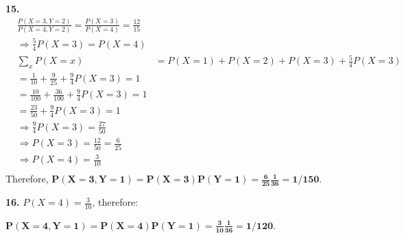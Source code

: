 \documentclass{homework}
\begin{document}
\textbf{\large 15.}
\begin{align*}
    & \frac{P(X=3, Y=2)}{P(X=4, Y=2)} = \frac{P(X=3)}{P(X=4)} = \frac{12}{15}\\
    & \Longrightarrow \frac{5}{4} P(X=3) = P(X=4)\\
    & \sum\limits_{x}{P(X=x)} &= P(X=1) + P(X=2) + P(X=3) + \frac{5}{4} P(X=3) \\
    & = \frac{1}{10} + \frac{9}{25} + \frac{9}{4} P(X=3) = 1\\
    & = \frac{10}{100} + \frac{36}{100} + \frac{9}{4} P(X=3) = 1\\
    & = \frac{23}{50} + \frac{9}{4} P(X=3) = 1\\
    & \Longrightarrow  \frac{9}{4} P(X=3) = \frac{27}{50}\\
    & \Longrightarrow  P(X=3) = \frac{12}{50} = \frac{6}{25}\\
    & \Longrightarrow  P(X=4) = \frac{3}{10}\\
\end{align*}
Therefore, $\mathbf{P(X=3, Y=1) = P(X=3) P(Y=1) = \frac{6}{25} \frac{1}{36} = 1/150}$.

\textbf{\large 16.}
$P(X=4) = \frac{3}{10}$, therefore:

$\mathbf{P(X=4, Y=1) = P(X=4) P(Y=1) = \frac{3}{10} \frac{1}{36} = 1/120}$.




\end{document}
